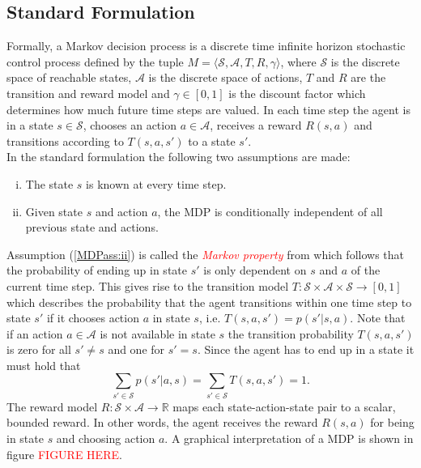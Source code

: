 \subsection{Standard Formulation}\label{subsec:MDPFormulation}
Formally, a Markov decision process is a discrete time infinite horizon stochastic control process defined by the tuple $M = \langle \mathcal{S}, \mathcal{A}, T, R, \gamma \rangle$, where $\mathcal{S}$ is the discrete space of reachable states, $\mathcal{A}$ is the discrete space of actions, $T$ and $R$ are the transition and reward model and $\gamma \in [0,1]$ is the discount factor which determines how much future time steps are valued. In each time step the agent is in a state $s\in\mathcal{S}$, chooses an action $a\in\mathcal{A}$, receives a reward $R(s,a)$ and transitions according to $T(s,a,s')$ to a state $s'$.\\

In the standard formulation the following two assumptions are made:
\begin{enumerate}[(i)]
    \item\label{MDPass:i} The state $s$ is known at every time step.
    \item\label{MDPass:ii} Given state $s$ and action $a$, the MDP is conditionally independent of all previous state and actions.
\end{enumerate}
Assumption (\ref{MDPass:ii}) is called the \textcolor{red}{\textit{Markov property}} from which follows that the probability of ending up in  state $s'$ is only dependent on $s$ and $a$ of the current time step. This gives rise to the transition model $T:\mathcal{S}\times\mathcal{A}\times\mathcal{S}\rightarrow [0,1]$ which describes the probability that the agent transitions within one time step to state $s'$ if it chooses action $a$ in state $s$, i.e. $T(s,a,s')=p(s'|s,a)$. Note that if an action $a\in\mathcal{A}$ is not available in state $s$ the transition probability $T(s,a,s')$ is zero for all $s'\neq s$ and one for $s'=s$. 
Since the agent has to end up in a state it must hold that 
\begin{equation}
    \sum_{s'\in\mathcal{S}}p(s'|a,s)=\sum_{s'\in\mathcal{S}}T(s,a,s')=1.
\end{equation}
The reward model $R:\mathcal{S}\times\mathcal{A}\rightarrow \mathbb{R}$ maps each state-action-state pair to a scalar, bounded reward. In other words, the agent receives the reward $R(s,a)$ for being in state $s$ and choosing action $a$.
A graphical interpretation of a MDP is shown in figure \textcolor{red}{FIGURE HERE}.\\

